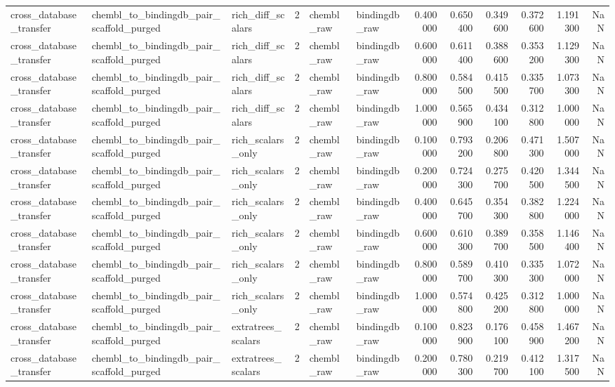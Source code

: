 \begin{longtable}{lllrllrrrrrr}
cross\_database\_transfer & chembl\_to\_bindingdb\_pair\_scaffold\_purged & rich\_diff\_scalars & 2 & chembl\_raw & bindingdb\_raw & 0.400000 & 0.650400 & 0.349600 & 0.372600 & 1.191300 & NaN \\
cross\_database\_transfer & chembl\_to\_bindingdb\_pair\_scaffold\_purged & rich\_diff\_scalars & 2 & chembl\_raw & bindingdb\_raw & 0.600000 & 0.611400 & 0.388600 & 0.353200 & 1.129300 & NaN \\
cross\_database\_transfer & chembl\_to\_bindingdb\_pair\_scaffold\_purged & rich\_diff\_scalars & 2 & chembl\_raw & bindingdb\_raw & 0.800000 & 0.584500 & 0.415500 & 0.335700 & 1.073300 & NaN \\
cross\_database\_transfer & chembl\_to\_bindingdb\_pair\_scaffold\_purged & rich\_diff\_scalars & 2 & chembl\_raw & bindingdb\_raw & 1.000000 & 0.565900 & 0.434100 & 0.312800 & 1.000000 & NaN \\
cross\_database\_transfer & chembl\_to\_bindingdb\_pair\_scaffold\_purged & rich\_scalars\_only & 2 & chembl\_raw & bindingdb\_raw & 0.100000 & 0.793200 & 0.206800 & 0.471300 & 1.507000 & NaN \\
cross\_database\_transfer & chembl\_to\_bindingdb\_pair\_scaffold\_purged & rich\_scalars\_only & 2 & chembl\_raw & bindingdb\_raw & 0.200000 & 0.724300 & 0.275700 & 0.420500 & 1.344500 & NaN \\
cross\_database\_transfer & chembl\_to\_bindingdb\_pair\_scaffold\_purged & rich\_scalars\_only & 2 & chembl\_raw & bindingdb\_raw & 0.400000 & 0.645700 & 0.354300 & 0.382800 & 1.224000 & NaN \\
cross\_database\_transfer & chembl\_to\_bindingdb\_pair\_scaffold\_purged & rich\_scalars\_only & 2 & chembl\_raw & bindingdb\_raw & 0.600000 & 0.610300 & 0.389700 & 0.358500 & 1.146400 & NaN \\
cross\_database\_transfer & chembl\_to\_bindingdb\_pair\_scaffold\_purged & rich\_scalars\_only & 2 & chembl\_raw & bindingdb\_raw & 0.800000 & 0.589700 & 0.410300 & 0.335300 & 1.072000 & NaN \\
cross\_database\_transfer & chembl\_to\_bindingdb\_pair\_scaffold\_purged & rich\_scalars\_only & 2 & chembl\_raw & bindingdb\_raw & 1.000000 & 0.574800 & 0.425200 & 0.312800 & 1.000000 & NaN \\
cross\_database\_transfer & chembl\_to\_bindingdb\_pair\_scaffold\_purged & extratrees\_scalars & 2 & chembl\_raw & bindingdb\_raw & 0.100000 & 0.823900 & 0.176100 & 0.458900 & 1.467200 & NaN \\
cross\_database\_transfer & chembl\_to\_bindingdb\_pair\_scaffold\_purged & extratrees\_scalars & 2 & chembl\_raw & bindingdb\_raw & 0.200000 & 0.780300 & 0.219700 & 0.412100 & 1.317500 & NaN \\

\end{longtable}
